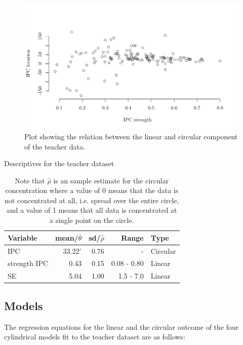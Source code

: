 \documentclass[11pt,]{article}
\begin{document}
\begin{figure}
\centering
\includegraphics[width = \textwidth]{Plots/dataplot.pdf}
\caption{Plot showing the relation between the linear and circular component of the teacher data.}
\label{dataplot}
\end{figure}

\begin{table}
\centering
\caption{Descriptives for the teacher dataset} 
\begin{tabular}{lrrrl}
  \noalign{\smallskip}\hline\noalign{\smallskip}
Variable & mean/$\bar{\theta}$ & sd/$\hat{\rho}$ & Range & Type \\ \hline\noalign{\smallskip}
IPC &33.22$^\circ$& 0.76 & - & Circular\\
strength IPC & 0.43 & 0.15 & 0.08 - 0.80 & Linear\\
SE & 5.04 & 1.00 & 1.5 - 7.0 & Linear\\
   \hline
\end{tabular}
\label{Tableteacherdescriptives}
\caption*{Note that $\hat{\rho}$ is an sample estimate for the circular concentration where a value of 0 means that the data is not concentrated at all, i.e. spread over the entire circle, and a value of 1 means that all data is concentrated at a single point on the circle. }
\end{table}

\subsection{Models}\label{DataModels}

The regression equations for the linear and the circular outcome of the
four cylindrical models fit to the teacher dataset are as follows:
\end{document}
